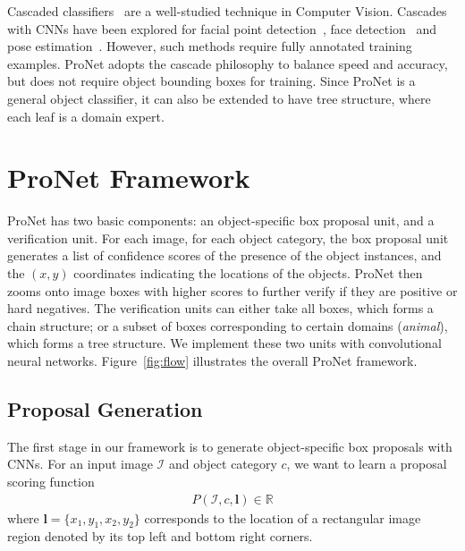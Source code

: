 \documentclass[10pt,twocolumn,letterpaper]{article}
\begin{document}
Cascaded classifiers~\cite{DBLP:conf/cvpr/ViolaJ01} are a well-studied technique in Computer Vision. Cascades with CNNs have been explored for facial point detection~\cite{DBLP:conf/cvpr/SunWT13}, face detection~\cite{DBLP:conf/cvpr/LiLSBH15} and pose estimation~\cite{DBLP:journals/corr/ToshevS13}. However, such methods require fully annotated training examples. ProNet adopts the cascade philosophy to balance speed and accuracy, but does not require object bounding boxes for training. Since ProNet is a general object classifier, it can also be extended to have tree structure, where each leaf is a domain expert.

\section{ProNet Framework}

ProNet has two basic components: an object-specific box proposal unit, and a verification unit. For each image, for each object category, the box proposal unit generates a list of confidence scores of the presence of the object instances, and the $(x,y)$ coordinates indicating the locations of the objects. ProNet then zooms onto image boxes with higher scores to further verify if they are positive or hard negatives. The verification units can either take all boxes, which forms a chain structure; or a subset of boxes corresponding to certain domains (\eg \textit{animal}), which forms a tree structure. We implement these two units with convolutional neural networks. Figure~\ref{fig:flow} illustrates the overall ProNet framework.




\subsection{Proposal Generation}
The first stage in our framework is to generate object-specific box proposals with CNNs. For an input image $\mathcal{I}$ and object category $c$, we want to learn a proposal scoring function
\begin{align*}
P(\mathcal{I}, c, \mathbf{l}) \in \mathbb{R}
\end{align*}
where $\mathbf{l} = \{x_1, y_1, x_2, y_2\}$ corresponds to the location of a rectangular image region denoted by its top left and bottom right corners.
\end{document}
